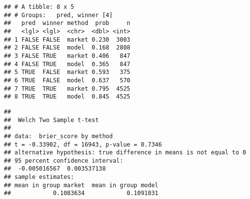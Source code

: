 \documentclass[]{article}
\newenvironment{Shaded}{\begin{snugshade}}{\end{snugshade}}
\newcommand{\DataTypeTok}[1]{\textcolor[rgb]{0.13,0.29,0.53}{#1}}
\newcommand{\DecValTok}[1]{\textcolor[rgb]{0.00,0.00,0.81}{#1}}
\newcommand{\FloatTok}[1]{\textcolor[rgb]{0.00,0.00,0.81}{#1}}
\newcommand{\KeywordTok}[1]{\textcolor[rgb]{0.13,0.29,0.53}{\textbf{#1}}}
\newcommand{\NormalTok}[1]{#1}
\newcommand{\OperatorTok}[1]{\textcolor[rgb]{0.81,0.36,0.00}{\textbf{#1}}}
\newcommand{\OtherTok}[1]{\textcolor[rgb]{0.56,0.35,0.01}{#1}}
\newcommand{\StringTok}[1]{\textcolor[rgb]{0.31,0.60,0.02}{#1}}
\begin{document}
\begin{verbatim}
## # A tibble: 8 x 5
## # Groups:   pred, winner [4]
##   pred  winner method  prob     n
##   <lgl> <lgl>  <chr>  <dbl> <int>
## 1 FALSE FALSE  market 0.230  3003
## 2 FALSE FALSE  model  0.168  2808
## 3 FALSE TRUE   market 0.406   847
## 4 FALSE TRUE   model  0.365   847
## 5 TRUE  FALSE  market 0.593   375
## 6 TRUE  FALSE  model  0.637   570
## 7 TRUE  TRUE   market 0.795  4525
## 8 TRUE  TRUE   model  0.845  4525
\end{verbatim}

\begin{Shaded}
\end{Shaded}

\begin{verbatim}
## 
##  Welch Two Sample t-test
## 
## data:  brier_score by method
## t = -0.33902, df = 16943, p-value = 0.7346
## alternative hypothesis: true difference in means is not equal to 0
## 95 percent confidence interval:
##  -0.005016567  0.003537138
## sample estimates:
## mean in group market  mean in group model 
##            0.1083634            0.1091031
\end{verbatim}

\begin{Shaded}
\end{Shaded}
\end{document}
